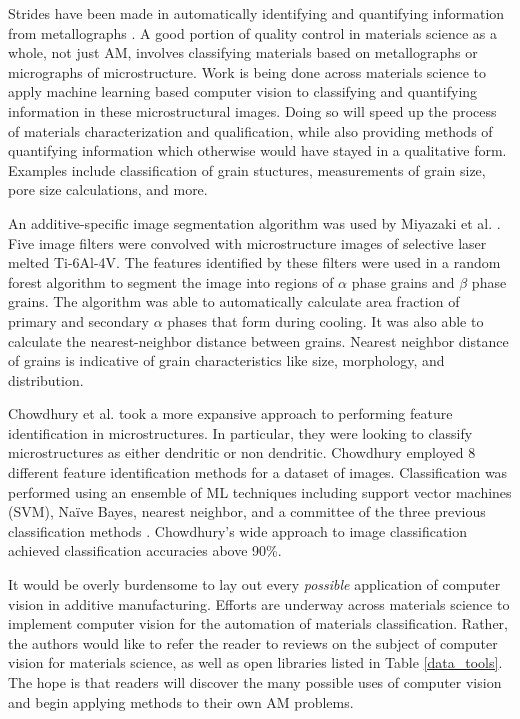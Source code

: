 Strides have been made in automatically identifying and quantifying information from metallographs \cite{DeCost2015, DeCost2017b, Ling2017a, Bulgarevich2018}. A good portion of quality control in materials science as a whole, not just AM, involves classifying materials based on metallographs or micrographs of microstructure. Work is being done across materials science to apply machine learning based computer vision to classifying and quantifying information in these microstructural images. Doing so will speed up the process of materials characterization and qualification, while also providing methods of quantifying information which otherwise would have stayed in a qualitative form. Examples include classification of grain stuctures, measurements of grain size, pore size calculations, and more.

An additive-specific image segmentation algorithm was used by Miyazaki et al. \cite{Miyazaki2019}. Five image filters were convolved with microstructure images of selective laser melted Ti-6Al-4V. The features identified by these filters were used in a random forest algorithm to segment the image into regions of $\alpha$ phase grains and $\beta$ phase grains. The algorithm was able to automatically calculate area fraction of primary and secondary $\alpha$ phases that form during cooling. It was also able to calculate the nearest-neighbor distance between grains. Nearest neighbor distance of grains is indicative of grain characteristics like size, morphology, and distribution. 

Chowdhury et al. took a more expansive approach to performing feature identification in microstructures. In particular, they were looking to classify microstructures as either dendritic or non dendritic. Chowdhury employed 8 different feature identification methods for a dataset of images. Classification was performed using an ensemble of ML techniques including support vector machines (SVM), Na\"ive Bayes, nearest neighbor, and a committee of the three previous classification methods \cite{Chowdhury2016}. Chowdhury's wide approach to image classification achieved classification accuracies above 90\%. 

It would be overly burdensome to lay out every \textit{possible} application of computer vision in additive manufacturing. Efforts are underway across materials science to implement computer vision for the automation of materials classification. Rather, the authors would like to refer the reader to reviews on the subject of computer vision for materials science, as well as open libraries listed in Table \ref{data_tools}. The hope is that readers will discover the many possible uses of computer vision and begin applying methods to their own AM problems. 

